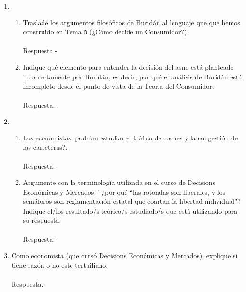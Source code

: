 \begin{enumerate}
\item 
    \begin{enumerate}[\bfseries a)]

	\item Traslade los argumentos filosóficos de Buridán al lenguaje que que hemos construido en Tema 5 (¿Cómo decide un Consumidor?).\\\\
	    Respuesta.-\;

	\item Indique qué elemento para entender la decisión del asno está planteado incorrectamente por Buridán, es decir, por qué el análisis de Buridán está incompleto desde el punto de vista de la Teoría del Consumidor.\\\\
	    Respuesta.-\;

    \end{enumerate}

\item 
    \begin{enumerate}[\bfseries a)]

	\item Los economistas, podrían estudiar el tráfico de coches y la congestión de las carreteras?.\\\\
	    Respuesta.-\;

	\item Argumente con la terminología utilizada en el curso de Decisions Económicas y Mercados ´ ¿por qué $“$las rotondas son liberales, y los semáforos son reglamentación estatal que coartan la libertad individual$”$? Indique el/los resultado/s teórico/s estudiado/s que está utilizando para su respuesta.\\\\
	    Respuesta.-\;

    \end{enumerate}

\item Como economista (que cursó Decisions Económicas y Mercados), explique si tiene razón o no este tertuiliano.\\\\
    Respuesta.-\;


\end{enumerate}
